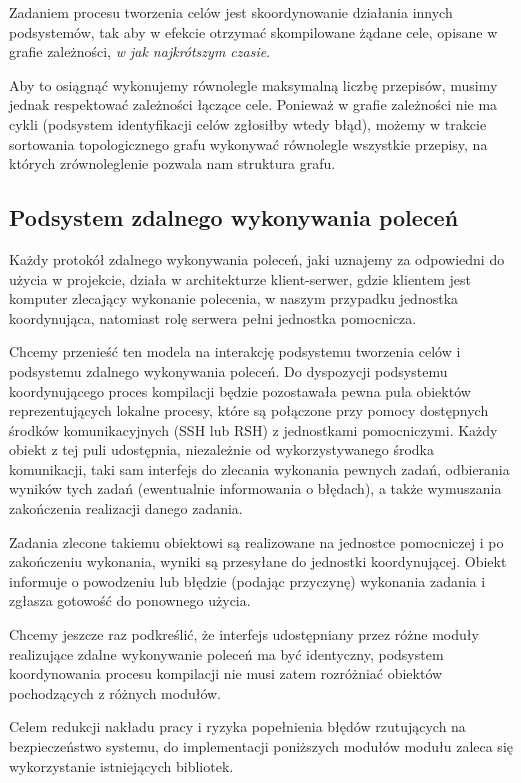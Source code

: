\documentclass[a4paper]{article}
\begin{document}
Zadaniem procesu tworzenia celów jest skoordynowanie działania innych podsystemów, tak aby w efekcie otrzymać skompilowane żądane cele, opisane w grafie zależności, \emph{w jak najkrótszym czasie}.

Aby to osiągnąć wykonujemy równolegle maksymalną liczbę przepisów, musimy jednak respektować zależności łączące cele.
Ponieważ w grafie zależności nie ma cykli (podsystem identyfikacji celów zgłosiłby wtedy błąd), możemy w trakcie sortowania topologicznego grafu wykonywać równolegle wszystkie przepisy, na których zrównoleglenie pozwala nam struktura grafu.

\subsection{Podsystem zdalnego wykonywania poleceń}

Każdy protokół zdalnego wykonywania poleceń, jaki uznajemy za odpowiedni do użycia w projekcie, działa w architekturze klient-serwer, gdzie klientem jest komputer zlecający wykonanie polecenia, w naszym przypadku jednostka koordynująca, natomiast rolę serwera pełni jednostka pomocnicza.

Chcemy przenieść ten modela na interakcję podsystemu tworzenia celów i podsystemu zdalnego wykonywania poleceń.
Do dyspozycji podsystemu koordynującego proces kompilacji będzie pozostawała pewna pula obiektów reprezentujących lokalne procesy, które są połączone przy pomocy dostępnych środków komunikacyjnych (SSH lub RSH) z jednostkami pomocniczymi.
Każdy obiekt z tej puli udostępnia, niezależnie od wykorzystywanego środka komunikacji, taki sam interfejs do zlecania wykonania pewnych zadań, odbierania wyników tych zadań (ewentualnie informowania o błędach), a także wymuszania zakończenia realizacji danego zadania.

Zadania zlecone takiemu obiektowi są realizowane na jednostce pomocniczej i po zakończeniu wykonania, wyniki są przesyłane do jednostki koordynującej.
Obiekt informuje o powodzeniu lub błędzie (podając przyczynę) wykonania zadania i zgłasza gotowość do ponownego użycia.

Chcemy jeszcze raz podkreślić, że interfejs udostępniany przez różne moduły realizujące zdalne wykonywanie poleceń ma być identyczny, podsystem koordynowania procesu kompilacji nie musi zatem rozróżniać obiektów pochodzących z różnych modułów.

Celem redukcji nakładu pracy i ryzyka popełnienia błędów rzutujących na bezpieczeństwo systemu, do implementacji poniższych modułów modułu zaleca się wykorzystanie istniejących bibliotek.
\end{document}

